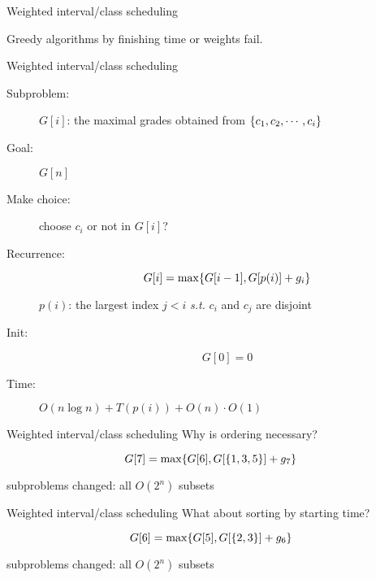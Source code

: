 \begin{frame}{Weighted interval/class scheduling}
  \centerline{Greedy algorithms by finishing time or weights fail.}
\end{frame}
\begin{frame}{Weighted interval/class scheduling}
  \begin{description}
	\item[Subproblem:] $G[i]$: the maximal grades obtained from $\{c_{1}, c_{2}, \cdots, c_{i}\}$
	\item[Goal:] $G[n]$
	  \pause
	\item[Make choice:] choose $c_{i}$ or not in $G[i]$?  
	\item[Recurrence:] 
	  \[
		G[i] = \max \{G[i-1], G[p(i)] + g_{i}\}
	  \]

	  $p(i)$: the largest index $j < i$ \emph{s.t.} $c_{i}$ and $c_{j}$ are disjoint
	  \pause
	\item[Init:]
	  \[
		G[0] = 0
	  \]
	  \pause
	\item[Time:] $O(n \log n) + T(p(i)) + O(n) \cdot O(1)$
  \end{description}
\end{frame}
\begin{frame}{Weighted interval/class scheduling}
  Why is ordering necessary?

  \[
	G[7] = \max \{G[6], G[\{1,3,5\}] + g_{7}\}
  \]

  \begin{center}
	subproblems changed: all $O(2^{n})$ subsets
  \end{center}
\end{frame}
\begin{frame}{Weighted interval/class scheduling}
  What about sorting by starting time?

  \[
	G[6] = \max \{G[5], G[\{2,3\}] + g_{6}\}
  \]

  \begin{center}
	subproblems changed: all $O(2^{n})$ subsets
  \end{center}
\end{frame}
